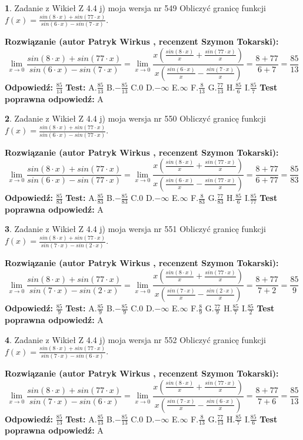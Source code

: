 \documentclass[12pt, a4paper]{article}
\theoremstyle{definition} %
\newtheorem{zad}{}
\newcommand{\zadStart}[1]{\begin{zad}#1\newline}
\newcommand{\zadStop}{\end{zad}}
\newcommand{\rozwStart}[2]{\noindent \textbf{Rozwiązanie (autor #1 , recenzent #2): }\newline}
\newcommand{\rozwStop}{\newline}
\newcommand{\odpStart}{\noindent \textbf{Odpowiedź:}\newline}
\newcommand{\odpStop}{\newline}
\newcommand{\testStart}{\noindent \textbf{Test:}\newline}
\newcommand{\testStop}{\newline}
\newcommand{\kluczStart}{\noindent \textbf{Test poprawna odpowiedź:}\newline}
\newcommand{\kluczStop}{\newline}
\begin{document}
\zadStart{Zadanie z Wikieł Z 4.4 j) moja wersja nr 549}
Obliczyć granicę funkcji $f(x)=\frac{sin(8\cdot x) +sin(77\cdot x)}{sin(6\cdot x) -sin(7\cdot x)}$.
\zadStop
\rozwStart{Patryk Wirkus}{Szymon Tokarski}
$$\lim\limits_{x\to 0}\frac{sin(8\cdot x) +sin(77\cdot x)}{sin(6\cdot x) -sin(7\cdot x)}=\lim\limits_{x\to 0}\frac{x(\frac{sin(8\cdot x)}{x}+\frac{sin(77\cdot x)}{x})}{x(\frac{sin(6\cdot x)}{x}-\frac{sin(7\cdot x)}{x})}=\frac{8+77}{6+7} = \frac{85}{13}$$
\rozwStop
\odpStart
$\frac{85}{13}$
\odpStop
\testStart
A.$\frac{85}{13}$
B.$-\frac{85}{13}$
C.$0$
D.$-\infty$
E.$\infty$
F.$\frac{8}{13}$
G.$\frac{77}{13}$
H.$\frac{85}{6}$
I.$\frac{85}{7}$
\testStop
\kluczStart
A
\kluczStop



\zadStart{Zadanie z Wikieł Z 4.4 j) moja wersja nr 550}
Obliczyć granicę funkcji $f(x)=\frac{sin(8\cdot x) +sin(77\cdot x)}{sin(6\cdot x) -sin(77\cdot x)}$.
\zadStop
\rozwStart{Patryk Wirkus}{Szymon Tokarski}
$$\lim\limits_{x\to 0}\frac{sin(8\cdot x) +sin(77\cdot x)}{sin(6\cdot x) -sin(77\cdot x)}=\lim\limits_{x\to 0}\frac{x(\frac{sin(8\cdot x)}{x}+\frac{sin(77\cdot x)}{x})}{x(\frac{sin(6\cdot x)}{x}-\frac{sin(77\cdot x)}{x})}=\frac{8+77}{6+77} = \frac{85}{83}$$
\rozwStop
\odpStart
$\frac{85}{83}$
\odpStop
\testStart
A.$\frac{85}{83}$
B.$-\frac{85}{83}$
C.$0$
D.$-\infty$
E.$\infty$
F.$\frac{8}{83}$
G.$\frac{77}{83}$
H.$\frac{85}{6}$
I.$\frac{85}{77}$
\testStop
\kluczStart
A
\kluczStop



\zadStart{Zadanie z Wikieł Z 4.4 j) moja wersja nr 551}
Obliczyć granicę funkcji $f(x)=\frac{sin(8\cdot x) +sin(77\cdot x)}{sin(7\cdot x) -sin(2\cdot x)}$.
\zadStop
\rozwStart{Patryk Wirkus}{Szymon Tokarski}
$$\lim\limits_{x\to 0}\frac{sin(8\cdot x) +sin(77\cdot x)}{sin(7\cdot x) -sin(2\cdot x)}=\lim\limits_{x\to 0}\frac{x(\frac{sin(8\cdot x)}{x}+\frac{sin(77\cdot x)}{x})}{x(\frac{sin(7\cdot x)}{x}-\frac{sin(2\cdot x)}{x})}=\frac{8+77}{7+2} = \frac{85}{9}$$
\rozwStop
\odpStart
$\frac{85}{9}$
\odpStop
\testStart
A.$\frac{85}{9}$
B.$-\frac{85}{9}$
C.$0$
D.$-\infty$
E.$\infty$
F.$\frac{8}{9}$
G.$\frac{77}{9}$
H.$\frac{85}{7}$
I.$\frac{85}{2}$
\testStop
\kluczStart
A
\kluczStop



\zadStart{Zadanie z Wikieł Z 4.4 j) moja wersja nr 552}
Obliczyć granicę funkcji $f(x)=\frac{sin(8\cdot x) +sin(77\cdot x)}{sin(7\cdot x) -sin(6\cdot x)}$.
\zadStop
\rozwStart{Patryk Wirkus}{Szymon Tokarski}
$$\lim\limits_{x\to 0}\frac{sin(8\cdot x) +sin(77\cdot x)}{sin(7\cdot x) -sin(6\cdot x)}=\lim\limits_{x\to 0}\frac{x(\frac{sin(8\cdot x)}{x}+\frac{sin(77\cdot x)}{x})}{x(\frac{sin(7\cdot x)}{x}-\frac{sin(6\cdot x)}{x})}=\frac{8+77}{7+6} = \frac{85}{13}$$
\rozwStop
\odpStart
$\frac{85}{13}$
\odpStop
\testStart
A.$\frac{85}{13}$
B.$-\frac{85}{13}$
C.$0$
D.$-\infty$
E.$\infty$
F.$\frac{8}{13}$
G.$\frac{77}{13}$
H.$\frac{85}{7}$
I.$\frac{85}{6}$
\testStop
\kluczStart
A
\kluczStop
\end{document}
